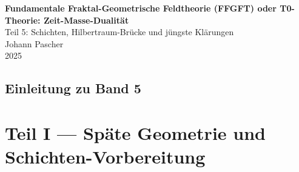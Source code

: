 


	
	\setcounter{section}{0}
	\setcounter{subsection}{0}
	\setcounter{subsubsection}{0}
	\setcounter{paragraph}{0}
	
	\setcounter{secnumdepth}{1}  %
	\makeatletter
	\renewcommand*\l@part[2]{%
		\ifnum \c@tocdepth >-2\relax
		\addpenalty{-\@highpenalty}%
		\addvspace{0.8em \@plus\p@}%
		{\leftskip 0em \relax
			\rightskip \@tocrmarg
			\parfillskip -\rightskip
			\parindent 0em \relax\@afterindenttrue
			\interlinepenalty\@M
			\leavevmode
			{\footnotesize\bfseries #1}\nobreak
			\leaders\hbox{$\m@th\mkern \@dotsep mu\hbox{}\mkern \@dotsep mu$}\hfill
			\nobreak\hb@xt@\@pnumwidth{\hss #2}\par}%
		\addvspace{0.2em \@plus\p@}%
		\nobreak
		\fi}
	\makeatother
	
	\renewcommand{\cftchapfont}{\footnotesize\bfseries}
	\renewcommand{\cftchappagefont}{\footnotesize\bfseries}
	\setlength{\cftbeforechapskip}{0.3em}
	
	\setcounter{tocdepth}{0}
	\begin{titlepage}
		\centering
		\vspace*{2cm}

		

	{\Huge\textbf{Fundamentale Fraktal-Geometrische Feldtheorie (FFGFT) oder T0-Theorie: Zeit-Masse-Dualität}}\\[1cm]
	{\Large Teil 5: Schichten, Hilbertraum-Brücke und jüngste Klärungen}\\[2cm]		
		{\large Johann Pascher}\\[1cm]
		
		{\large 2025}
		
		\vfill
	\end{titlepage}
	
	\frontmatter
	\pagestyle{fancy}
	\makeatletter
	\let\ps@plain\ps@fancy
	\let\ps@empty\ps@fancy
	\makeatother
	
		\mainmatter
	\chapter{Einleitung zu Band 5}
	
	
	\part{Teil I --- Späte Geometrie und Schichten-Vorbereitung}
